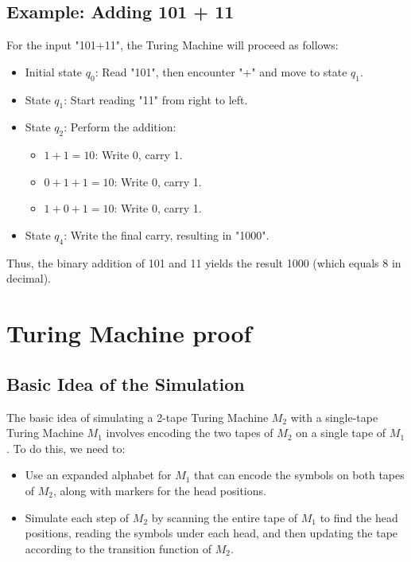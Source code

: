 \documentclass[a4paper]{article}
\begin{document}
\subsection{Example: Adding 101 + 11}

For the input "101+11", the Turing Machine will proceed as follows:

\begin{itemize}
    \item Initial state $q_0$: Read "101", then encounter "+" and move to state $q_1$.
    \item State $q_1$: Start reading "11" from right to left.
    \item State $q_2$: Perform the addition:
    \begin{itemize}
        \item $1 + 1 = 10$: Write 0, carry 1.
        \item $0 + 1 + 1 = 10$: Write 0, carry 1.
        \item $1 + 0 + 1 = 10$: Write 0, carry 1.
    \end{itemize}
    \item State $q_4$: Write the final carry, resulting in "1000".
\end{itemize}

Thus, the binary addition of 101 and 11 yields the result 1000 (which equals 8 in decimal).

\section{Turing Machine proof}
\subsection{Basic Idea of the Simulation}

The basic idea of simulating a 2-tape Turing Machine \( M_2 \) with a single-tape Turing Machine \( M_1 \) involves encoding the two tapes of \( M_2 \) on a single tape of \( M_1 \). To do this, we need to:
\begin{itemize}
    \item Use an expanded alphabet for \( M_1 \) that can encode the symbols on both tapes of \( M_2 \), along with markers for the head positions.
    \item Simulate each step of \( M_2 \) by scanning the entire tape of \( M_1 \) to find the head positions, reading the symbols under each head, and then updating the tape according to the transition function of \( M_2 \).
\end{itemize}
\end{document}
